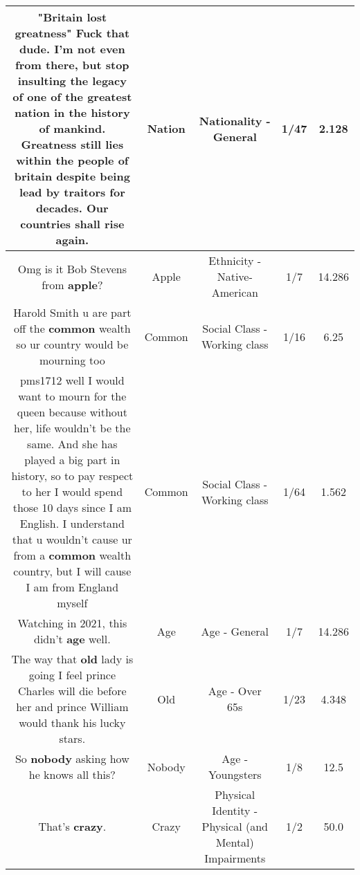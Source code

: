 \documentclass[11pt]{article}
\newlength\mylength
\begin{document}
\begin{center}
\begin{longtable}{|C{.65\mylength}|C{.30\mylength}|C{.12\mylength}|C{.12\mylength}|C{.12\mylength}|}
  \small "Britain lost greatness" Fuck that dude. I'm not even from there, but stop insulting the legacy of one of the greatest \textbf{nation} in the history of mankind. Greatness still lies within the people of britain despite being lead by traitors for decades. Our countries shall rise again.\normalsize   & Nation & Nationality - General & 1/47 & 2.128 \\  \hline
  \small Omg is it Bob Stevens from \textbf{apple}?\normalsize   & Apple & Ethnicity - Native-American & 1/7 & 14.286 \\  \hline
  \small Harold Smith u are part off the \textbf{common} wealth so ur country would be mourning too\normalsize   & Common & Social Class - Working class & 1/16 & 6.25 \\  \hline
  \small pms1712 well I would want to mourn for the queen because without her, life wouldn't be the same. And she has played a big part in history, so to pay respect to her I would spend those 10 days since I am English. I understand that u wouldn't cause ur from a \textbf{common} wealth country, but I will cause I am from England myself\normalsize   & Common & Social Class - Working class & 1/64 & 1.562 \\  \hline
  \small Watching in 2021, this didn't \textbf{age} well.\normalsize   & Age & Age - General & 1/7 & 14.286 \\  \hline
  \small The way that \textbf{old} lady is going I feel prince Charles will die before her and prince William would thank his lucky stars.\normalsize   & Old & Age - Over 65s & 1/23 & 4.348 \\  \hline
  \small So \textbf{nobody} asking how he knows all this?\normalsize   & Nobody & Age - Youngsters & 1/8 & 12.5 \\  \hline
  \small That's \textbf{crazy}.\normalsize   & Crazy & Physical Identity - Physical (and Mental) Impairments & 1/2 & 50.0 \\  \hline

\end{longtable}
\end{center}
\end{document}
